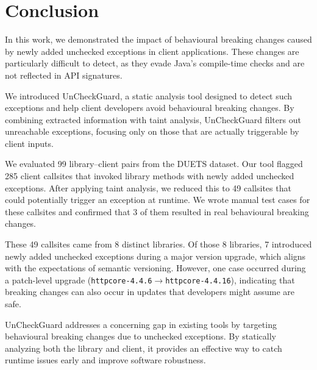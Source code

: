 \chapter{Conclusion}
In this work, we demonstrated the impact of behavioural breaking changes caused by newly added unchecked exceptions in client applications. These changes are particularly difficult to detect, as they evade Java's compile-time checks and are not reflected in API signatures.

We introduced UnCheckGuard, a static analysis tool designed to detect such exceptions and help client developers avoid behavioural breaking changes. By combining extracted information with taint analysis, UnCheckGuard filters out unreachable exceptions, focusing only on those that are actually triggerable by client inputs.

We evaluated 99 library–client pairs from the DUETS dataset. Our tool flagged 285 client callsites that invoked library methods with newly added unchecked exceptions. After applying taint analysis, we reduced this to 49 callsites that could potentially trigger an exception at runtime. We wrote manual test cases for these callsites and confirmed that 3 of them resulted in real behavioural breaking changes.

These 49 callsites came from 8 distinct libraries. Of those 8 libraries, 7 introduced newly added unchecked exceptions during a major version upgrade, which aligns with the expectations of semantic versioning. However, one case occurred during a patch-level upgrade (\texttt{httpcore-4.4.6}$\rightarrow$\texttt{httpcore-4.4.16}), indicating that breaking changes can also occur in updates that developers might assume are safe.

UnCheckGuard addresses a concerning gap in existing tools by targeting behavioural breaking changes due to unchecked exceptions. By statically analyzing both the library and client, it provides an effective way to catch runtime issues early and improve software robustness.
